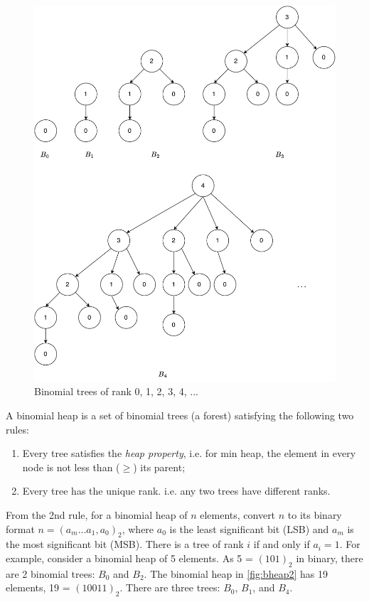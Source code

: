 \documentclass[b5paper]{article}
\begin{document}
\begin{figure}[htbp]
  \centering
  \includegraphics[scale=0.45]{img/Bn-trees}
  \caption{Binomial trees of rank 0, 1, 2, 3, 4, ...}
  \label{fig:bitree-forms}
\end{figure}

\label{Binomial heap} 
A binomial heap is a set of binomial trees (a forest) satisfying the following two rules:

\begin{enumerate}
\item Every tree satisfies the {\em heap property}, i.e. for min heap, the element in every node is not less than ($\geq$) its parent;
\item Every tree has the unique rank. i.e. any two trees have different ranks.
\end{enumerate}

From the 2nd rule, for a binomial heap of $n$ elements, convert $n$ to its binary format $n = (a_m ... a_1, a_0)_2$, where $a_0$ is the least significant bit (LSB) and $a_m$ is the most significant bit (MSB). There is a tree of rank $i$ if and only if $a_i = 1$. For example, consider a binomial heap of 5 elements. As 5 = $(101)_2$ in binary, there are 2 binomial trees: $B_0$ and $B_2$. The binomial heap in \cref{fig:bheap2} has 19 elements, 19 = $(10011)_2$. There are three trees: $B_0$, $B_1$, and $B_4$.
\end{document}
